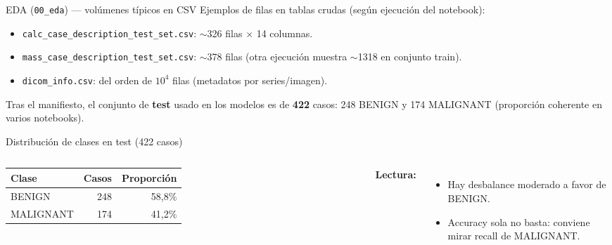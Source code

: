 \documentclass[aspectratio=169,spanish]{beamer}
\begin{document}
\begin{frame}{EDA (\texttt{00\_eda}) — volúmenes típicos en CSV}
  Ejemplos de filas en tablas crudas (según ejecución del notebook):
  \begin{itemize}
    \item \texttt{calc\_case\_description\_test\_set.csv}: $\sim$326 filas $\times$ 14 columnas.
    \item \texttt{mass\_case\_description\_test\_set.csv}: $\sim$378 filas (otra ejecución muestra $\sim$1318 en conjunto train).
    \item \texttt{dicom\_info.csv}: del orden de $10^4$ filas (metadatos por series/imagen).
  \end{itemize}
  \vspace{0.4em}
  Tras el manifiesto, el conjunto de \textbf{test} usado en los modelos es de \textbf{422} casos: 248 BENIGN y 174 MALIGNANT (proporción coherente en varios notebooks).
\end{frame}

\begin{frame}{Distribución de clases en test (422 casos)}
  \begin{columns}[T]
    \small
    \begin{tabular}{@{}lrr@{}}
      \toprule
      Clase & Casos & Proporción \\
      \midrule
      BENIGN    & 248 & 58{,}8\% \\
      MALIGNANT & 174 & 41{,}2\% \\
      \bottomrule
    \end{tabular}

    \vspace{0.6em}
    \textbf{Lectura:}
    \begin{itemize}
      \item Hay desbalance moderado a favor de BENIGN.
      \item Accuracy sola no basta: conviene mirar recall de MALIGNANT.
    \end{itemize}

    \centering
\end{columns}
\end{frame}
\end{document}
